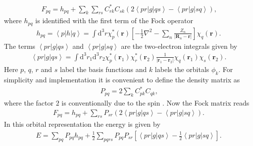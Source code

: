 \documentclass[10pt,a4paper]{article} %
\renewcommand{\d}{\mathrm{d}}
\begin{document}
\begin{align*}
F_{pq} = h_{pq} + \sum\limits_k \sum\limits_{rs} C_{rk}^* C_{sk} \left( 2 \left<pr|g|qs\right> -  \left<pr|g|sq\right> \right)\text{,}
\end{align*} where $h_{pq}$ is identified with the first term of the Fock operator
\begin{align*}
h_{pq} = \left< p|h|q\right> = \int \d^3 r \chi_p^*(\mathbf{r})\left[ -\frac{1}{2} \nabla^2 - \sum\limits_n \frac{Z_n}{\left| \mathbf{R}_n -\mathbf{r} \right|} \right]\chi_q(\mathbf{r})\text{.}
\end{align*} The terms $\left<pr|g|qs\right>$ and $\left<pr|g|sq\right>$ are the two-electron integrals given by
\begin{align*}
\left<pr|g|qs\right> = \int \d^3 r_1 \d^3 r_2 \chi_p^*(\mathbf{r}_1) \chi_r^*(\mathbf{r}_2) \frac{1}{\left| \mathbf{r}_1 -\mathbf{r}_2 \right|} \chi_q(\mathbf{r}_1) \chi_s(\mathbf{r}_2) \text{.}
\end{align*} Here $p$, $q$, $r$ and $s$ label the basis functions and $k$ labels the orbitals $\phi_k$.
For simplicity and implementation it is convenient to define the density matrix as
\begin{align*}
P_{pq} = 2\sum\limits_k C_{pk}^* C_{qk} \text{,}
\end{align*} where the factor $2$ is conventionally due to the spin \cite{Thijssen2007}.
Now the Fock matrix reads
\begin{align*}
F_{pq} = h_{pq} + \sum\limits_{rs} P_{sr} \left( 2 \left<pr|g|qs\right> -  \left<pr|g|sq\right> \right)\text{.}
\end{align*} In this orbital representation the energy is given by
\begin{align*}
E = \sum\limits_{pq} P_{pq}h_{pq} + \frac{1}{2}  \sum\limits_{pqrs} P_{pq}P_{sr} \left[ \left<pr|g|qs\right> -  \frac{1}{2}\left<pr|g|sq\right> \right] \text{.}
\end{align*}
    
\end{document}
